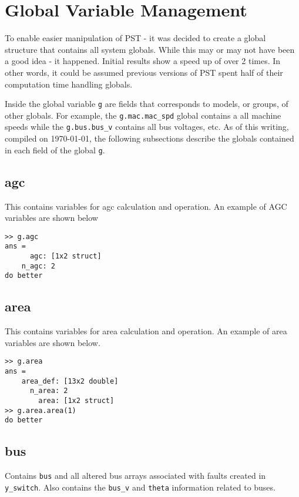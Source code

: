 \pagebreak
\section{Global Variable Management}  
To enable easier manipulation of PST - it was decided to create a global structure that contains all system globals.
While this may or may not have been a good idea - it happened.
Initial results show a speed up of over 2 times.
In other words, it could be assumed previous versions of PST spent half of their computation time handling globals.


Inside the global variable \verb|g| are fields that corresponds to models, or groups, of other globals.
For example, the \verb|g.mac.mac_spd| global contains a all machine speeds while the \verb|g.bus.bus_v| contains all bus voltages, etc.
As of this writing, compiled on \today, the following subsections describe the globals contained in each field of the global \verb|g|. 


\subsection{agc}  
This contains variables for agc calculation and operation.
An example of AGC variables are shown below

\begin{verbatim}
>> g.agc
ans = 
      agc: [1x2 struct]
    n_agc: 2
do better
\end{verbatim}

\subsection{area}  
This contains variables for area calculation and operation.
An example of area variables are shown below.
\begin{verbatim}
>> g.area
ans = 
    area_def: [13x2 double]
      n_area: 2
        area: [1x2 struct]
>> g.area.area(1)
do better
\end{verbatim}

\subsection{bus}  
Contains \verb|bus| and all altered bus arrays associated with faults created in \verb|y_switch|.
Also contains the \verb|bus_v| and \verb|theta| information related to buses.



